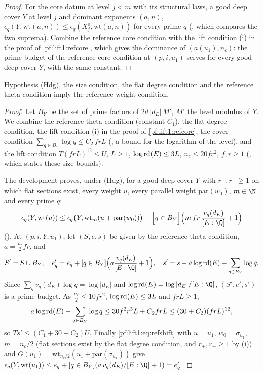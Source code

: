 \begin{proof}
For the core datum at level $j<m$ with its structural laws, a good deep cover $Y$ at level $j$ and
dominant exponents $(a,n)$, $\epsilon_q(Y,\mathrm{wt}(a,n))\le\epsilon_q(X^o_j,\mathrm{wt}(a,n))$ for
every prime $q$ (, which compares the two suprema).
Combine the reference core condition with the lift condition (i) in the proof of \cref{pf:lift1:refcore},
which gives the dominance of $(a(u_1),n_c)$: the prime budget of the reference core condition at
$(p,i,u_1)$ serves for every good deep cover $Y$, with the same constant.
\end{proof}

\begin{lemma}\label{pf:lift1:reftow}
Hypothesis (Hdg), the size condition, the flat degree condition and the reference theta condition
imply the reference weight condition.
\end{lemma}

\begin{proof}
Let $B_Y$ be the set of prime factors of $2d\,|d_E|\,M'$, $M'$ the level modulus of $Y$. We combine the
reference theta condition (constant $C_1$), the flat degree condition, the lift condition (i) in the
proof of \cref{pf:lift1:refcore}, the cover condition $\sum_{q\in B_Y}\log q\le C_2\,frL$
(, a bound for the logarithm of the level), and
the lift condition $T(frL)^{12}\le U$, $L\ge1$, $\log\mathrm{rd}(E)\le3L$, $n_c\le20fr^2$, $f,r\ge1$
(, which states these size bounds).

The development proves, under (Hdg), for a good deep cover $Y$ with $r_+,r_-\ge1$ on which flat
sections exist, every weight $u$, every parallel weight $\mathrm{par}(w_0)$, $m\in\N$ and every prime
$q$:
\begin{equation}\label{pf:lift1:eq:refshift}
\epsilon_q(Y,\mathrm{wt}(u))\le\epsilon_q\bigl(Y,\mathrm{wt}_m(u+\mathrm{par}(w_0))\bigr)
+\Bigl[q\in B_Y\Bigr]\Bigl(m\,fr\,\frac{v_q(d_E)}{[E:\Q]}+1\Bigr)
\end{equation}
(). At $(p,i,Y,u_1)$, let $(S,e,s)$ be
given by the reference theta condition, $a=\frac{n_c}2fr$, and
\[
S'=S\cup B_Y,\quad e'_q=e_q+[q\in B_Y]\Bigl(a\frac{v_q(d_E)}{[E:\Q]}+1\Bigr),\quad
s'=s+a\log\liftonerd(E)+\sum_{q\in B_Y}\log q .
\]
Since $\sum_q v_q(d_E)\log q=\log|d_E|$ and $\log\liftonerd(E)=\log|d_E|/[E:\Q]$, $(S',e',s')$ is a prime
budget. As $\frac{n_c}2\le10fr^2$, $\log\mathrm{rd}(E)\le3L$ and $frL\ge1$,
\[
a\log\mathrm{rd}(E)+\sum_{q\in B_Y}\log q\le30f^2r^3L+C_2frL\le(30+C_2)(frL)^{12},
\]
so $Ts'\le(C_1+30+C_2)U$. Finally \eqref{pf:lift1:eq:refshift} with $u=u_1$, $w_0=\sigma_{u_1}$,
$m=n_c/2$ (flat sections exist by the flat degree condition, and $r_+,r_-\ge1$ by (i)) and
$G(u_1)=\mathrm{wt}_{n_c/2}(u_1+\mathrm{par}(\sigma_{u_1}))$ give
$\epsilon_q(Y,\mathrm{wt}(u_1))\le e_q+[q\in B_Y](a\,v_q(d_E)/[E:\Q]+1)=e'_q$.
\end{proof}

